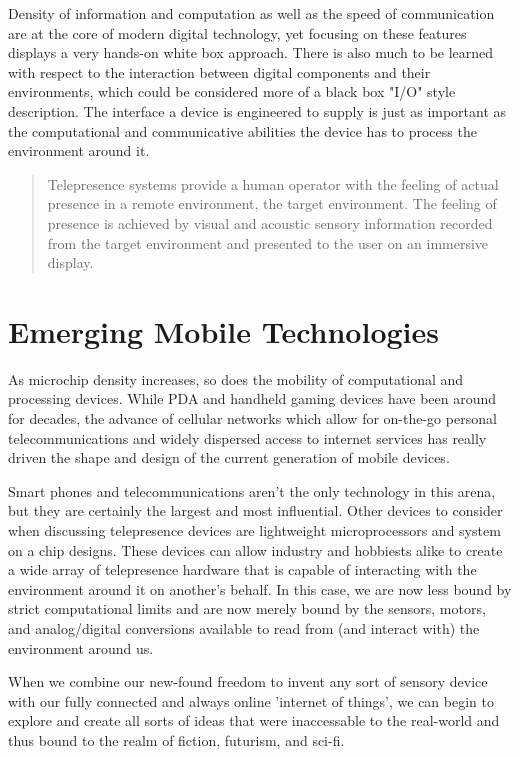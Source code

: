 \documentclass[a4paper,12pt]{report}
\begin{document}
Density of information and computation as well as the speed of communication are at the core of modern digital technology, yet focusing on these features displays a very hands-on white box approach. There is also much to be learned with respect to the interaction between digital components and their environments, which could be considered more of a black box "I/O" style description. The interface a device is engineered to supply is just as important as the computational and communicative abilities the device has to process the environment around it.

\begin{quotation}
Telepresence systems provide a human operator with the feeling of actual presence in a remote environment, the target environment. The feeling of presence is achieved by visual and acoustic sensory information recorded from the target environment and presented to the user on an immersive display.
	\begin{flushright}
		\cite{6094998}
	\end{flushright}
\end{quotation}

\section{Emerging Mobile Technologies}
As microchip density increases, so does the mobility of computational and processing devices. While PDA and handheld gaming devices have been around for decades, the advance of cellular networks which allow for on-the-go personal telecommunications and widely dispersed access to internet services has really driven the shape and design of the current generation of mobile devices.

Smart phones and telecommunications aren't the only technology in this arena, but they are certainly the largest and most influential. Other devices to consider when discussing telepresence devices are lightweight microprocessors and system on a chip designs. These devices can allow industry and hobbiests alike to create a wide array of telepresence hardware that is capable of interacting with the environment around it on another's behalf. In this case, we are now less bound by strict computational limits and are now merely bound by the sensors, motors, and analog/digital conversions available to read from (and interact with) the environment around us.

When we combine our new-found freedom to invent any sort of sensory device with our fully connected and always online 'internet of things', we can begin to explore and create all sorts of ideas that were inaccessable to the real-world and thus bound to the realm of fiction, futurism, and sci-fi.
\end{document}
